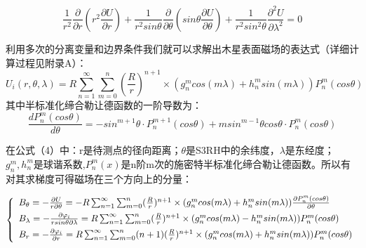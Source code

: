 \documentclass{article}
\begin{document}
    \begin{equation}
        \frac{1}{r^{2}}\frac{\partial}{\partial{r}}(r^2\frac{\partial{U}}{\partial{r}})+\frac{1}{r^2sin\theta}\frac{\partial}{\partial\theta}(sin\theta\frac{\partial{U}}{\partial\theta}) + \frac{1}{r^2sin^2\theta}\frac{\partial^{2}U}{\partial{\lambda}^2}=0
   \end{equation}
   


利用多次的分离变量和边界条件我们就可以求解出木星表面磁场的表达式（详细计算过程见附录A）：
\begin{equation}
    U_i(r, \theta,\lambda)=R\sum_{n=1}^{\infty}\sum_{m=0}^{n}(\frac{R}{r})^{n+1}\times(g_{n}^{m}cos(m\lambda)+h_{n}^{m}sin(m\lambda))P^{m}_{n}(cos\theta)
\end{equation}
其中半标准化缔合勒让德函数的一阶导数为：
\begin{equation}
    \frac{dP^{m}_{n}(cos\theta)}{d\theta} = -sin^{m+1}\theta\cdot{P^{m+1}_{n}(cos\theta)}+
    msin^{m-1}\theta{cos}\theta\cdot{P^{m}_{n}(cos\theta)}
\end{equation}

在公式（4）中：r是待测点的径向距离；$\theta$是S3RH中的余纬度，$\lambda$是东经度；$g_n^m,h_n^m$是球谐系数,$P_n^m(x)$是n阶m次的施密特半标准化缔合勒让德函数。所以有对其求梯度可得磁场在三个方向上的分量：


\begin{equation}
  \left\{
    \begin{array}{l}\vspace{1ex} 
            B_{\theta}=-\frac{\partial{U}}{r\partial\theta}= -R\sum_{n=1}^{\infty}\sum_{m=0}^{n}(\frac{R}{r})^{n+1}\times(g_{n}^{m}cos(m\lambda)+h_{n}^{m}sin(m\lambda))\frac{\partial{P^{m}_{n}}(cos\theta)}{\partial\theta}\\ \vspace{1ex} 
            B_{\lambda}=-\frac{\partial\varphi_i}{rsin\theta\partial\lambda}=R\sum_{n=1}^{\infty}\sum_{m=0}^{n}(\frac{R}{r})^{n+1}\times(g_{n}^{m}cos(m\lambda)-h_{n}^{m}sin(m\lambda))P^{m}_{n}(cos\theta) \\ \vspace{1ex} 
            B_r = -\frac{\partial\varphi_i}{\partial{r}}=R\sum_{n=1}^{\infty}\sum_{m=0}^{n}(n+1)(\frac{R}{r})^{n+1}\times(g_{n}^{m}cos(m\lambda)+h_{n}^{m}sin(m\lambda))P^{m}_{n}(cos\theta)
            
        \end{array}
\right.
\end{equation}
\end{document}

